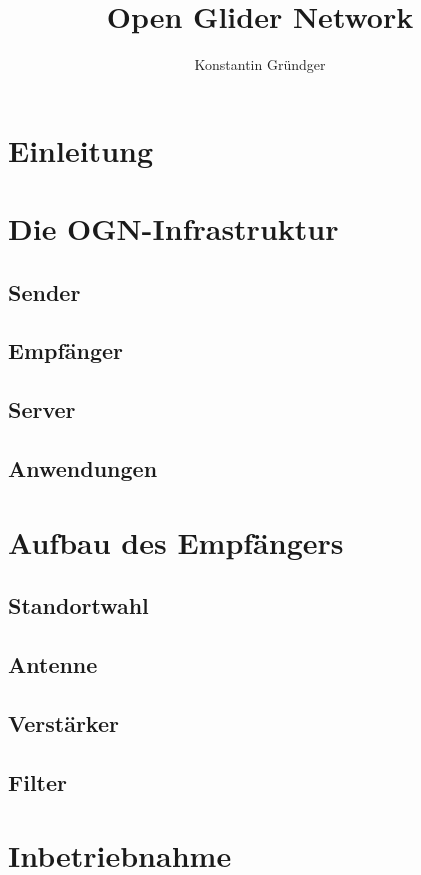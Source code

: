 \documentclass[a4paper]{article}
\title{Open Glider Network}
\author{Konstantin Gründger}
\date{}
\begin{document}
\maketitle

\tableofcontents


\section{Einleitung}

\section{Die OGN-Infrastruktur}
\subsection{Sender}
\subsection{Empfänger}
\subsection{Server}
\subsection{Anwendungen}

\section{Aufbau des Empfängers}
\subsection{Standortwahl}
\subsection{Antenne}
\subsection{Verstärker}
\subsection{Filter}

\section{Inbetriebnahme}
\end{document}
